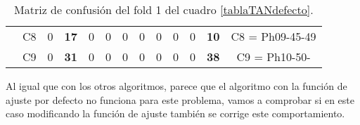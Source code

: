 \begin{table}[H]
{\begin{tabular}{|ccrrrrrrrrrrc|}
\multicolumn{1}{|c|}{}                                      & \multicolumn{1}{c|}{C8} & \multicolumn{1}{c|}{0}  & \multicolumn{1}{c|}{\textbf{17}} & \multicolumn{1}{c|}{0}  & \multicolumn{1}{c|}{0}  & \multicolumn{1}{c|}{0}  & \multicolumn{1}{c|}{0}  & \multicolumn{1}{c|}{0}  & \multicolumn{1}{c|}{0}  & \multicolumn{1}{c|}{0}  & \multicolumn{1}{c|}{\textbf{10}} & C8 = Ph09-45-49   \\ \cline{2-13}
\multicolumn{1}{|c|}{}                                      & \multicolumn{1}{c|}{C9} & \multicolumn{1}{c|}{0}  & \multicolumn{1}{c|}{\textbf{31}} & \multicolumn{1}{c|}{0}  & \multicolumn{1}{c|}{0}  & \multicolumn{1}{c|}{0}  & \multicolumn{1}{c|}{0}  & \multicolumn{1}{c|}{0}  & \multicolumn{1}{c|}{0}  & \multicolumn{1}{c|}{0}  & \multicolumn{1}{c|}{\textbf{38}} & C9 = Ph10-50-     \\ \hline
\end{tabular}%
}
\caption{Matriz de confusión del fold 1 del cuadro \ref{tablaTANdefecto}.}
\end{table}

Al igual que con los otros algoritmos, parece que el algoritmo con la función de ajuste por defecto no funciona para este problema, vamos a comprobar si en este caso modificando la función de ajuste también se corrige este comportamiento.

